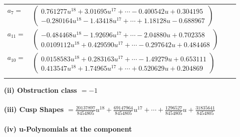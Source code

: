 \documentclass[1p]{elsarticle_modified}
\theoremstyle{definition}
\begin{document}
\begin{tabular}{m{7pt} m{180pt} m{7pt} m{180pt} }
\flushright $a_{7}=$&$\begin{pmatrix}0.761277 u^{18}+3.01695 u^{17}+\cdots-0.400542 u+0.304195\\-0.280164 u^{18}-1.43418 u^{17}+\cdots+1.18128 u-0.688967\end{pmatrix}$ \\
\flushright $a_{11}=$&$\begin{pmatrix}-0.484468 u^{18}-1.92696 u^{17}+\cdots-2.04880 u+0.702358\\0.0109112 u^{18}+0.429590 u^{17}+\cdots-0.297642 u+0.484468\end{pmatrix}$ \\
\flushright $a_{10}=$&$\begin{pmatrix}0.0158583 u^{18}+0.283163 u^{17}+\cdots-1.49279 u+0.653111\\0.413547 u^{18}+1.74965 u^{17}+\cdots+0.520629 u+0.204869\end{pmatrix}$\\&\end{tabular}
\flushleft \textbf{(ii) Obstruction class $= -1$}\\~\\
\flushleft \textbf{(iii) Cusp Shapes $= \frac{20137897}{8454805} u^{18}+\frac{69147964}{8454805} u^{17}+\cdots+\frac{1296527}{8454805} u+\frac{31835641}{8454805}$}\\~\\
\newpage\renewcommand{\arraystretch}{1}
\flushleft \textbf{(iv) u-Polynomials at the component}\newline \\
\end{document}
